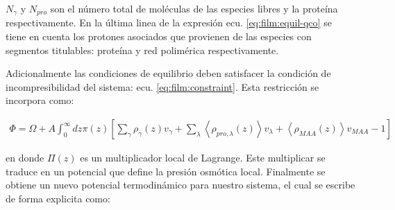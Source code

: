 \noindent $N_\gamma$ y $ N_{pro}$ son el n\'umero total de mol\'eculas de las especies libres y la prote\'ina respectivamente. En la \'ultima linea de la expresi\'on ecu. \ref{eq:film:equil-qco} se tiene en cuenta los protones asociados que  provienen de las especies con segmentos titulables: prote\'ina y red polim\'erica respectivamente.


Adicionalmente las condiciones de equilibrio deben satisfacer la condici\'on de incompresibilidad del sistema: ecu. \ref{eq:film:constraint}.  Esta restricci\'on se incorpora como:

\begin{align}
	\Phi = \Omega +A \int_0^\infty dz\pi(z){\left[\sum_{\gamma}\rho_\gamma(z) v_\gamma + \sum_\lambda{\left<\rho_{pro,\lambda}(z)\right>v_\lambda} + \left<\rho_{MAA}(z)\right>v_{MAA} -1 \right]}
\end{align}


\noindent en donde $\Pi(z)$ es un multiplicador local de Lagrange.  Este multiplicar se traduce en un potencial que define la presi\'on osm\'otica local. Finalmente se obtiene un nuevo potencial termodin\'amico para nuestro sistema, el cual se escribe de forma explicita como:
 
